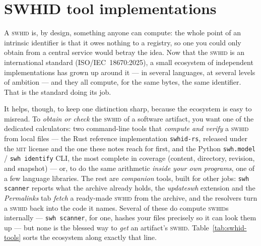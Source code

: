\chapter{SWHID tool implementations}
\label{app:swhid-tools}

A \textsc{swhid} is, by design, something anyone can compute: the whole point of an intrinsic
identifier is that it owes nothing to a registry, so one you could only obtain from a central
service would betray the idea. Now that the \textsc{swhid} is an international standard
(ISO/IEC~18670:2025), a small ecosystem of independent implementations has grown up around it ---
in several languages, at several levels of ambition --- and they all compute, for the same bytes,
the same identifier. That is the standard doing its job.

It helps, though, to keep one distinction sharp, because the ecosystem is easy to misread. To
\emph{obtain or check} the \textsc{swhid} of a software artifact, you want one of the dedicated
calculators: two command-line tools that \emph{compute and verify} a \textsc{swhid} from local files
--- the Rust reference implementation \texttt{swhid-rs}, released under the \textsc{mit} license and
the one these notes reach for first, and the Python \texttt{swh.model} / \texttt{swh identify} CLI,
the most complete in coverage (content, directory, revision, and snapshot) --- or, to do the same
arithmetic \emph{inside your own programs}, one of a few language libraries. The rest are
\emph{companion} tools, built for other jobs: \texttt{swh scanner} reports what the archive already
holds, the \emph{updateswh} extension and the \emph{Permalinks} tab \emph{fetch} a ready-made
\textsc{swhid} from the archive, and the resolvers turn a \textsc{swhid} back into the code it names.
Several of these do compute \textsc{swhid}s internally --- \texttt{swh scanner}, for one, hashes your
files precisely so it can look them up --- but none is the blessed way to \emph{get} an artifact's
\textsc{swhid}. Table~\ref{tab:swhid-tools} sorts the ecosystem along exactly that line.

